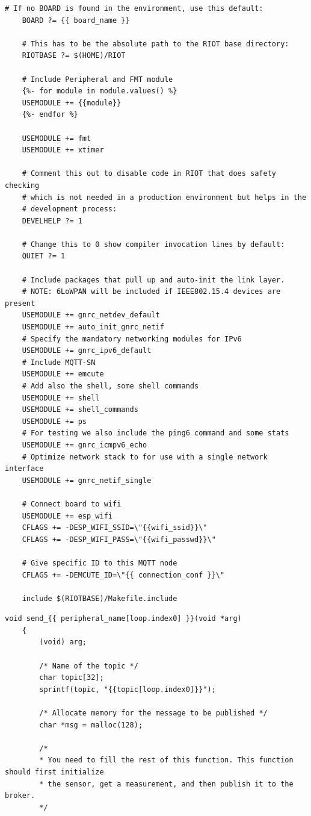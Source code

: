 \begin{appendices}
\begin{lstlisting}[style=MakefileStyle, title={Πρότυπο παραγωγής αρχείου Makefile}]
	# If no BOARD is found in the environment, use this default:
	BOARD ?= {{ board_name }}
	
	# This has to be the absolute path to the RIOT base directory:
	RIOTBASE ?= $(HOME)/RIOT
	
	# Include Peripheral and FMT module
	{%- for module in module.values() %}
	USEMODULE += {{module}}
	{%- endfor %}
		
	USEMODULE += fmt
	USEMODULE += xtimer
	
	# Comment this out to disable code in RIOT that does safety checking
	# which is not needed in a production environment but helps in the
	# development process:
	DEVELHELP ?= 1
	
	# Change this to 0 show compiler invocation lines by default:
	QUIET ?= 1
	
	# Include packages that pull up and auto-init the link layer.
	# NOTE: 6LoWPAN will be included if IEEE802.15.4 devices are present
	USEMODULE += gnrc_netdev_default
	USEMODULE += auto_init_gnrc_netif
	# Specify the mandatory networking modules for IPv6
	USEMODULE += gnrc_ipv6_default
	# Include MQTT-SN
	USEMODULE += emcute
	# Add also the shell, some shell commands
	USEMODULE += shell
	USEMODULE += shell_commands
	USEMODULE += ps
	# For testing we also include the ping6 command and some stats
	USEMODULE += gnrc_icmpv6_echo
	# Optimize network stack to for use with a single network interface
	USEMODULE += gnrc_netif_single
	
	# Connect board to wifi
	USEMODULE += esp_wifi
	CFLAGS += -DESP_WIFI_SSID=\"{{wifi_ssid}}\"
	CFLAGS += -DESP_WIFI_PASS=\"{{wifi_passwd}}\"
	
	# Give specific ID to this MQTT node
	CFLAGS += -DEMCUTE_ID=\"{{ connection_conf }}\"
	
	include $(RIOTBASE)/Makefile.include	
\end{lstlisting}

\newpage

\begin{lstlisting}[style=CStyle, title={Πρότυπο παραγωγής κώδικα για μη υποστηριζόμενο αισθητήρα}]
	void send_{{ peripheral_name[loop.index0] }}(void *arg)
	{
		(void) arg;
		
		/* Name of the topic */
		char topic[32];
		sprintf(topic, "{{topic[loop.index0]}}");
		
		/* Allocate memory for the message to be published */
		char *msg = malloc(128);
		
		/*
		* You need to fill the rest of this function. This function should first initialize
		* the sensor, get a measurement, and then publish it to the broker. 
		*/
		

\end{lstlisting}
\end{appendices}
